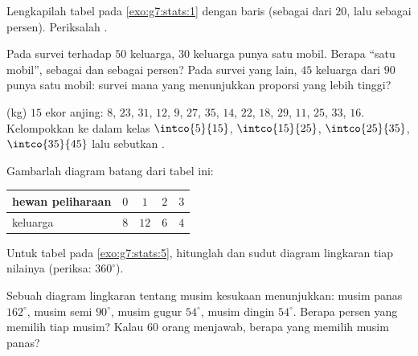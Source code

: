 \begin{exercise}[$\star$]\label{exo:g7:stats:2}
Lengkapilah tabel pada \cref{exo:g7:stats:1} dengan baris  (sebagai  dari $20$, lalu sebagai persen). Periksalah .
\end{exercise}

\begin{exercise}[$\star$]\label{exo:g7:stats:3}
Pada survei terhadap $50$ keluarga, $30$ keluarga punya satu mobil.
Berapa  ``satu mobil'', sebagai  dan
sebagai persen? Pada survei yang lain, $45$ keluarga dari $90$ punya
satu mobil: survei mana yang menunjukkan proporsi yang lebih tinggi?
\end{exercise}

\begin{exercise}[$\star$]\label{exo:g7:stats:4}
 (kg) $15$ ekor anjing: $8$, $23$, $31$, $12$, $9$, $27$, $35$,
$14$, $22$, $18$, $29$, $11$, $25$, $33$, $16$. Kelompokkan ke dalam
kelas $\intco{5}{15}$, $\intco{15}{25}$, $\intco{25}{35}$,
$\intco{35}{45}$ lalu sebutkan .
\end{exercise}

\begin{exercise}[$\star$]\label{exo:g7:stats:5}
Gambarlah diagram batang dari tabel ini:
\begin{center}
\renewcommand{\arraystretch}{1.2}
\begin{tabular}{l|cccc}
hewan peliharaan & $0$ & $1$ & $2$ & $3$ \\
\hline
keluarga & $8$ & $12$ & $6$ & $4$ \\
\end{tabular}
\end{center}
\end{exercise}

\begin{exercise}[$\star$]\label{exo:g7:stats:6}
Untuk tabel pada \cref{exo:g7:stats:5}, hitunglah 
dan sudut diagram lingkaran tiap nilainya (periksa:  $360^\circ$).
\end{exercise}

\begin{exercise}[$\star$]\label{exo:g7:stats:7}
Sebuah diagram lingkaran tentang musim kesukaan menunjukkan: musim
panas $162^\circ$, musim semi $90^\circ$, musim gugur $54^\circ$,
musim dingin $54^\circ$. Berapa persen yang memilih tiap musim? Kalau
$60$ orang menjawab, berapa yang memilih musim panas?
\end{exercise}

